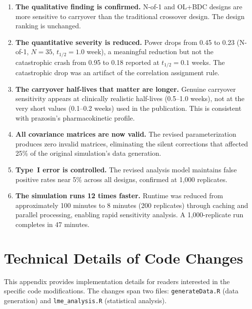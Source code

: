 \documentclass[11pt]{article}
\begin{document}
\begin{enumerate}
\item \textbf{The qualitative finding is confirmed.} N-of-1
  and OL+BDC designs are more sensitive to carryover than the
  traditional crossover design. The design ranking is
  unchanged.

\item \textbf{The quantitative severity is reduced.} Power
  drops from 0.45 to 0.23 (N-of-1, $N = 35$, $t_{1/2} = 1.0$
  week), a meaningful reduction but not the catastrophic
  crash from 0.95 to 0.18 reported at $t_{1/2} = 0.1$ weeks.
  The catastrophic drop was an artifact of the correlation
  assignment rule.

\item \textbf{The carryover half-lives that matter are longer.}
  Genuine carryover sensitivity appears at clinically realistic
  half-lives (0.5--1.0 weeks), not at the very short values
  (0.1--0.2 weeks) used in the publication. This is consistent
  with prazosin's pharmacokinetic profile.

\item \textbf{All covariance matrices are now valid.} The
  revised parameterization produces zero invalid matrices,
  eliminating the silent corrections that affected 25\% of the
  original simulation's data generation.

\item \textbf{Type~I error is controlled.} The revised
  analysis model maintains false positive rates near 5\%
  across all designs, confirmed at 1,000 replicates.

\item \textbf{The simulation runs 12 times faster.} Runtime
  was reduced from approximately 100 minutes to 8 minutes
  (200 replicates) through caching and parallel processing,
  enabling rapid sensitivity analysis. A 1,000-replicate run
  completes in 47 minutes.
\end{enumerate}

\appendix
\section{Technical Details of Code Changes}

This appendix provides implementation details for readers
interested in the specific code modifications. The changes
span two files: \texttt{generateData.R} (data generation)
and \texttt{lme\_analysis.R} (statistical analysis).
\end{document}
